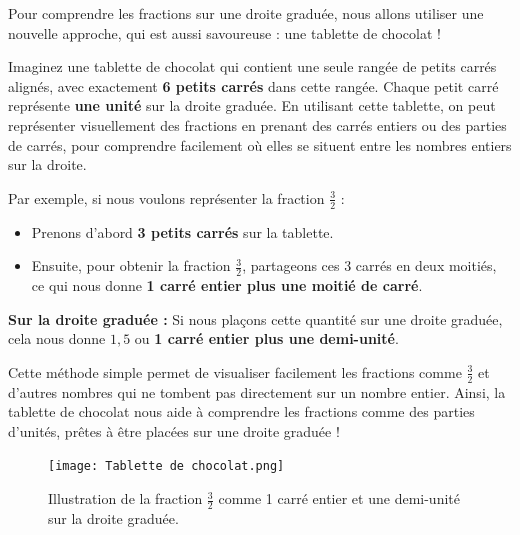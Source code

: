 \documentclass{article}
\begin{document}
\vspace{0.2cm}

\begin{tcolorbox}[colback=cyan!10!white, colframe=brown!75!black, title=\textcolor{white}{Nouvelle Représentation des Fractions}, sharp corners=southwest]
    Pour comprendre les fractions sur une droite graduée, nous allons utiliser une nouvelle approche, qui est aussi savoureuse : une tablette de chocolat ! 

    Imaginez une tablette de chocolat qui contient une seule rangée de petits carrés alignés, avec exactement \textbf{6 petits carrés} dans cette rangée. Chaque petit carré représente \textbf{une unité} sur la droite graduée. En utilisant cette tablette, on peut représenter visuellement des fractions en prenant des carrés entiers ou des parties de carrés, pour comprendre facilement où elles se situent entre les nombres entiers sur la droite.

    Par exemple, si nous voulons représenter la fraction \(\frac{3}{2}\) :
    
    \begin{itemize}
        \item Prenons d’abord \textbf{3 petits carrés} sur la tablette. 
        \item Ensuite, pour obtenir la fraction \(\frac{3}{2}\), partageons ces 3 carrés en deux moitiés, ce qui nous donne \textbf{1 carré entier plus une moitié de carré}.
    \end{itemize}

    \textbf{Sur la droite graduée :} Si nous plaçons cette quantité sur une droite graduée, cela nous donne $1,5$ ou \textbf{1 carré entier plus une demi-unité}.

    Cette méthode simple permet de visualiser facilement les fractions comme \(\frac{3}{2}\) et d’autres nombres qui ne tombent pas directement sur un nombre entier. Ainsi, la tablette de chocolat nous aide à comprendre les fractions comme des parties d’unités, prêtes à être placées sur une droite graduée !
\end{tcolorbox}

\vspace{0.2cm}

\begin{figure}[H]
    \centering
    \texttt{[image: Tablette de chocolat.png]}
    \caption{Illustration de la fraction \(\frac{3}{2}\) comme 1 carré entier et une demi-unité sur la droite graduée.}
    \label{fig:enter-label}
\end{figure}
\end{document}
